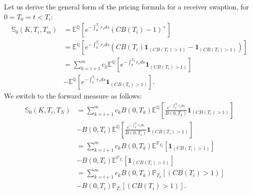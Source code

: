  Let us derive the general form of the pricing formula for a receiver swaption, for $0=T_{0}=t <T_{i}$:
\begin{align}
\mathbb{S}_{0}(K,T_{i},T_{m})&=\mathbb{E}^{\mathbb{Q}}\left[e^{-\int_{0}^{T_{i}}{r_s ds}}\left(CB(T_{i})-1 \right)^{+} \right]\nonumber\\
&=\mathbb{E}^{\mathbb{Q}}\left[e^{-\int_{0}^{T_{i}}{r_s ds}}\left(CB(T_{i})\textbf{1}_{\left(CB(T_{i})>1\right)}-\textbf{1}_{\left(CB(T_{i})>1\right)} \right) \right]\nonumber\\
&=\sum_{k=i+1}^{m}{c_{k}\mathbb{E}^{\mathbb{Q}}\left[e^{-\int_{0}^{T_{k}}{r_s ds}}\textbf{1}_{\left(CB(T_{i})>1\right)}\right]}\nonumber\\
&-\mathbb{E}^{\mathbb{Q}}\left[e^{-\int_{0}^{T_{i}}{r_s ds}}\textbf{1}_{\left(CB(T_{i})>1\right)}\right].\nonumber
\end{align}
We switch to the forward measure as follows:
\begin{align}
\mathbb{S}_{0}(K,T_{i},T_{N})&=\sum_{k=i+1}^{m}{c_{k}B(0,T_{k})\mathbb{E}^{\mathbb{Q}}\left[\frac{e^{-\int_{0}^{T_{k}}{r_s ds}}}{B(0,T_{k})}\textbf{1}_{\left(CB(T_{i})>1\right)}\right]}\nonumber\\
&-B(0,T_{i})\mathbb{E}^{\mathbb{Q}}\left[\frac{e^{-\int_{0}^{T_{i}}{r_s ds}}}{B(0,T_{i})}\textbf{1}_{\left(CB(T_{i})>1\right)}\right]\nonumber\\
&=\sum_{k=i+1}^{m}{c_{k}B(0,T_{k})\mathbb{E}^{\mathbb{P}_{T_{k}}}\left[\textbf{1}_{\left(CB(T_{i})>1\right)}\right]}\nonumber\\
&-B(0,T_{i})\mathbb{E}^{\mathbb{P}_{T_{i}}}\left[\textbf{1}_{\left(CB(T_{i})>1\right)}\right]\nonumber\\
&=\sum_{k=i+1}^{m}{c_{k}B(0,T_{k})\mathbb{P}_{T_{k}}\left[\left(CB(T_{i})>1\right)\right]}\nonumber\\
&-B(0,T_{i})\mathbb{P}_{T_{i}}\left[\left(CB(T_{i})>1\right)\right].\nonumber
\end{align}

